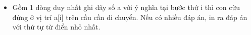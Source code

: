 \begin{itemize}
	\item Gồm 1 dòng duy nhất ghi dãy số a với ý nghĩa tại bước thứ i thì con cừu đứng ở vị trí a[i] trên cầu cần di chuyển. Nếu có nhiều đáp án, in ra đáp án với thứ tự từ điển nhỏ nhất.
\end{itemize}
